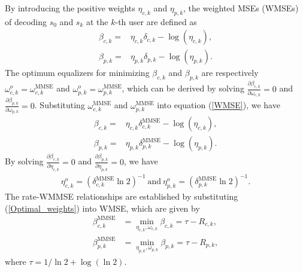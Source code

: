 \documentclass[10pt,journal,twocolumn]{IEEEtran}
\begin{document}
By introducing the positive weights $\eta_{c,k}$ and $\eta_{p,k}$, the weighted MSEs (WMSEs) of decoding $s_0$ and $s_k$ at the $k$-th user are defined as 
\begin{subequations}\label{WMSE}
\begin{align}
\beta_{c,k}=&\eta_{c,k}\delta_{c,k}-\log\left(\eta_{c,k}\right), \\
\beta_{p,k}=&\eta_{p,k}\delta_{p,k}-\log\left(\eta_{p,k}\right).
\end{align}
\end{subequations}
The optimum equalizers for minimizing $\beta_{c,k}$ and $ \beta_{p,k}$ are respectively $\omega^o_{c,k}=\omega^{\text{MMSE}}_{c,k}$ and $\omega^o_{p,k}=\omega^{\text{MMSE}}_{p,k}$, which can be derived by solving $\frac{\partial \beta_{c,k}}{\partial \omega_{c,k}}=0$ and $\frac{\partial \beta_{p,k}}{\partial \omega_{p,k}}=0$. Substituting $\omega^{\text{MMSE}}_{c,k}$ and $\omega^{\text{MMSE}}_{p,k}$ into equation (\ref{WMSE}), we have
\begin{subequations}
\begin{align}
\beta_{c,k}=&\eta_{c,k}\delta^{\text{MMSE}}_{c,k}-\log\left(\eta_{c,k}\right), \\
\beta_{p,k}=&\eta_{p,k}\delta^{\text{MMSE}}_{p,k}-\log\left(\eta_{p,k}\right).
\end{align}
\end{subequations}
By solving $\frac{\partial \beta_{c,k}}{\partial \eta_{c,k}}=0$ and $\frac{\partial \beta_{p,k}}{\partial \eta_{p,k}}=0$, we have
\begin{align}
\eta^o_{c,k}=\left(\delta^{\text{MMSE}}_{c,k}\ln 2\right)^{-1}~\text{and} ~\eta^o_{p,k}=\left(\delta^{\text{MMSE}}_{p,k}\ln 2\right)^{-1}.
\label{Optimal_weights}
\end{align}
The rate-WMMSE relationships are established by substituting (\ref{Optimal_weights}) into WMSE, which are given by 
\begin{subequations}\label{Relationship}
\begin{align}
\beta^{\text{MMSE}}_{c,k} &=\min_{\eta_{c,k},\omega_{c,k}}\beta_{c,k}= \tau-R_{c,k},\\
\beta^{\text{MMSE}}_{p,k} &=\min_{\eta_{p,k},\omega_{p,k}}\beta_{p,k}= \tau-R_{p,k},
\end{align}
\end{subequations}
where $\tau=1/\ln 2 +\log(\ln 2)$.
\end{document}
